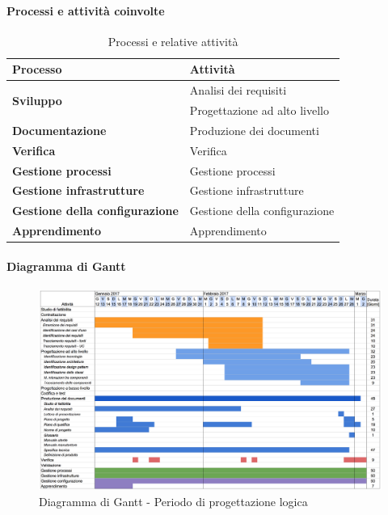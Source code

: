 		\paragraph{Processi e attività coinvolte}
			\begin{table}[H]
				\centering
				\begin{tabular}{ll}
					\toprule
					\textbf{Processo}                           & \textbf{Attività}              \\
					\midrule
					\multirow{2}{*}{\textbf{Sviluppo}}          & Analisi dei requisiti          \\
					& Progettazione ad alto livello  \\
					\midrule
					\textbf{Documentazione}            & Produzione dei documenti       \\
					\midrule
					\textbf{Verifica}                  & Verifica                       \\
					\midrule
					\textbf{Gestione processi} 					& Gestione processi              \\
					\midrule
					\textbf{Gestione infrastrutture}				& Gestione infrastrutture        \\
					\midrule
					\textbf{Gestione della configurazione}				& Gestione della configurazione        \\
					\midrule
					\textbf{Apprendimento} 						& Apprendimento                 \\
					\bottomrule
				\end{tabular}
				\caption{Processi e relative attività}
				\label{Pl-ProcessiAttività}
			\end{table}
		\paragraph{Diagramma di Gantt}
		\begin{figure}[H]
			\centering
			\includegraphics[width=\textwidth]{img/Gantt/g2c.png}
			\caption{Diagramma di Gantt - Periodo di progettazione logica}
		\end{figure}
	
